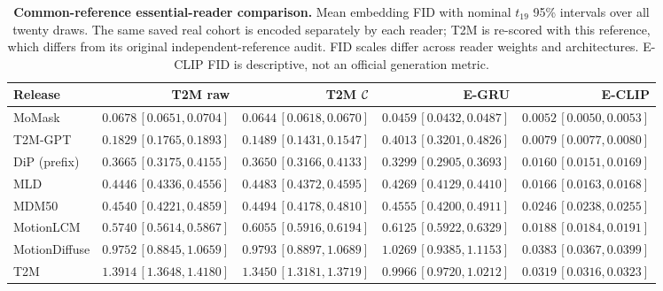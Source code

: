 \begin{table}[t]
\centering\small
\caption{\textbf{Common-reference essential-reader comparison.} Mean embedding FID with nominal $t_{19}$ 95\% intervals over all twenty draws. The same saved real cohort is encoded separately by each reader; T2M is re-scored with this reference, which differs from its original independent-reference audit. FID scales differ across reader weights and architectures. E-CLIP FID is descriptive, not an official generation metric.}\label{tab:mardmfull}
\begin{tabular}{@{}lrrrr@{}}\toprule
Release&T2M raw&T2M $\mathcal{C}$&E-GRU&E-CLIP\\\midrule
MoMask&$0.0678\, [0.0651,0.0704]$&$0.0644\, [0.0618,0.0670]$&$0.0459\, [0.0432,0.0487]$&$0.0052\, [0.0050,0.0053]$\\
T2M-GPT&$0.1829\, [0.1765,0.1893]$&$0.1489\, [0.1431,0.1547]$&$0.4013\, [0.3201,0.4826]$&$0.0079\, [0.0077,0.0080]$\\
DiP (prefix)&$0.3665\, [0.3175,0.4155]$&$0.3650\, [0.3166,0.4133]$&$0.3299\, [0.2905,0.3693]$&$0.0160\, [0.0151,0.0169]$\\
MLD&$0.4446\, [0.4336,0.4556]$&$0.4483\, [0.4372,0.4595]$&$0.4269\, [0.4129,0.4410]$&$0.0166\, [0.0163,0.0168]$\\
MDM50&$0.4540\, [0.4221,0.4859]$&$0.4494\, [0.4178,0.4810]$&$0.4555\, [0.4200,0.4911]$&$0.0246\, [0.0238,0.0255]$\\
MotionLCM&$0.5740\, [0.5614,0.5867]$&$0.6055\, [0.5916,0.6194]$&$0.6125\, [0.5922,0.6329]$&$0.0188\, [0.0184,0.0191]$\\
MotionDiffuse&$0.9752\, [0.8845,1.0659]$&$0.9793\, [0.8897,1.0689]$&$1.0269\, [0.9385,1.1153]$&$0.0383\, [0.0367,0.0399]$\\
T2M&$1.3914\, [1.3648,1.4180]$&$1.3450\, [1.3181,1.3719]$&$0.9966\, [0.9720,1.0212]$&$0.0319\, [0.0316,0.0323]$\\
\bottomrule\end{tabular}\end{table}
